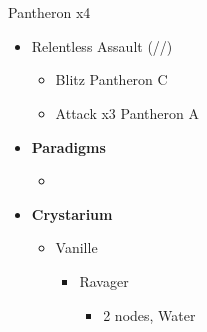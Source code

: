 \chapter{}

\renewcommand{\first}{[1] Relentless Assault (\com/\rav/\rav)}

\begin{battle}{Pantheron x4}
\begin{itemize}
    \item \first
    \begin{itemize}
        \item Blitz Pantheron C
        \item Attack x3 Pantheron A
    \end{itemize}
\end{itemize}
\end{battle}


\begin{menu}
\begin{multicols}{2}
\begin{itemize}
    \item \textbf{Paradigms}
    \begin{itemize}
        \item {}%
{\paradigmline{\rav}{\rav}{}}%
{\paradigmline{\syn}{\sab}{}}%
{\paradigmline{\rav}{\med}{}}%
{\paradigmline[4]{\textit{\rav}}{\textit{[\sab]}}{}}%
{\paradigmline{[\rav]}{\rav}{}}
    \end{itemize}
    \columnbreak
    \item \textbf{Crystarium}
    \begin{itemize}
        \item Vanille
        \begin{itemize}
            \item Ravager
            \begin{itemize}
                \item 2 nodes, Water
            \end{itemize}
        \end{itemize}
    \end{itemize}
\end{itemize}
\end{multicols}
\end{menu}

\renewcommand{\first}{[1] Dualcasting (\rav/\rav)}
\renewcommand{\second}{[2] Tide Turner (\syn/\sab)}
\renewcommand{\third}{[3] Yin \& Yang (\rav/\med)}
\renewcommand{\fourth}{[4] Undermine (\rav/\sab)}
\renewcommand{\fifth}{[5] Dualcasting (\rav/\rav)}


